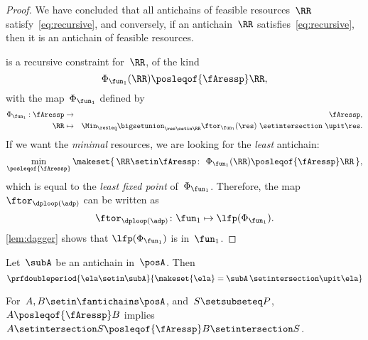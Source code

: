 \begin{proof}
    We have concluded that all antichains of feasible resources~$\RR$ satisfy~\cref{eq:recursive}, and conversely, if an antichain~$\RR$ satisfies~\cref{eq:recursive}, then it is an antichain of feasible resources.

     is a recursive constraint for~$\RR$, of the kind
    \begin{equation*}
        \Phi_{\fun_{1}}(\RR)\posleqof{\fAressp}\RR,
    \end{equation*}
    with the map~$\Phi_{\fun_{1}}$ defined by
    \begin{eqnarray}
        \Phi_{\fun_{1}}:\fAressp & \to     & \fAressp,\label{eq:bigphi} \\
        \RR                      & \mapsto & \Min_{\resleq}\bigsetunion_{\res\setin\RR}\ftor_{\fun_{1}}(\res)\ \setintersection\ \upit\res.\nonumber
    \end{eqnarray}
    If we want the \emph{minimal} resources, we are looking for the \emph{least} antichain:
    \begin{equation*}
        \min_{\posleqof{\fAressp}}\makeset{\,\RR\setin\fAressp\colon\ \Phi_{\fun_{1}}(\RR)\posleqof{\fAressp}\RR\,},
    \end{equation*}
    which is equal to the \emph{least fixed point }of~$\Phi_{\fun_{1}}$.
    Therefore, the map $\ftor_{\dploop(\adp)}$ can be written as
    \begin{equation}
        \ftor_{\dploop(\adp)}\colon\fun_{1}\mapsto\lfp(\Phi_{\fun_{1}}).
        \label{eq:loop_fixpoint}
    \end{equation}
    \cref{lem:dagger} shows that $\lfp(\Phi_{\fun_{1}})$ is \scottcontinuous in~$\fun_{1}$.
\end{proof}
\begin{lemma}
    \label{lem:antichain-write}
    Let~$\subA$ be an antichain in~$\posA$.
    Then
    \begin{equation*}
        \prfdoubleperiod{
            \ela\setin \subA
        }{
            \makeset{\ela}=\subA\,\setintersection\upit \ela
        }
    \end{equation*}
\end{lemma}

\begin{lemma}
    \label{lem:antichain_inter}
    For~$A,B\setin\fantichains\posA$, and~$S\setsubseteq P$,
    $A\posleqof{\fAressp}B$ implies $A\setintersection S\posleqof{\fAressp}B\setintersection S$.
\end{lemma}

